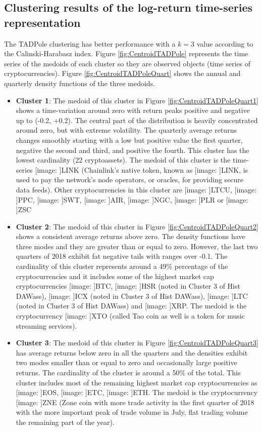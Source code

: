\documentclass{bmcart}
\def\texttt{[image: ]}
\begin{document}
\subsection*{Clustering results of the log-return time-series representation}
The  TADPole clustering \cite{TADPole2015} has better performance with a $k=3$ value according to the Calinski-Harabasz index. Figure \ref{fig:CentroidTADPole} represents the time series of the medoids of each cluster so they are observed objects (time series of cryptocurrencies). Figure \ref{fig:CentroidTADPoleQuart} shows the annual and quarterly density functions of the three medoids. 

\begin{itemize}
	\item \textbf{Cluster 1}: The medoid of this cluster in Figure \ref{fig:CentroidTADPoleQuart1} shows a time-variation around zero with return peaks positive and negative up to (-0.2, +0.2). The central part of the distribution is heavily concentrated around zero, but with extreme volatility. The quarterly average returns changes smoothly starting with a low but positive value the first quarter, negative the second and third, and positive the fourth. This cluster has the lowest cardinality (22 cryptoassets). The medoid of this cluster is the time-series \texttt{LINK} (Chainlink’s native token, known as \texttt{LINK}, is used to pay the network’s node operators, or oracles, for providing secure data feeds). Other cryptocurrencies in this cluster are \texttt{LTCU}, \texttt{PPC}, \texttt{SWT}, \texttt{AIR}, \texttt{NGC}, \texttt{PLR} or \texttt{ZSC}
	
	\item \textbf{Cluster 2}: The medoid of this cluster in Figure \ref{fig:CentroidTADPoleQuart2} shows a consistent average returns above zero. The density functions have three modes and they are greater than or equal to zero. However, the last two quarters of 2018 exhibit fat negative tails with ranges over -0.1.  The cardinality of this cluster represents around a 49\% percentage of the cryptocurrencies and it includes some of the highest market cap cryptocurrencies \texttt{BTC}, \texttt{HSR} (noted in Cluster 3 of Hist DAWass), \texttt{ICX} (noted in Cluster 3 of Hist DAWass), \texttt{LTC} (noted in Cluster 3 of Hist DAWass) and \texttt{XRP}. The medoid is the cryptocurrency \texttt{XTO} (called Tao coin as well is a  token for music streaming services). 
	
	\item \textbf{Cluster 3}: The medoid of this cluster in Figure \ref{fig:CentroidTADPoleQuart3} has average returns  below zero in all the quarters and the densities exhibit two modes smaller than or equal to zero and occasionally large positive returns. The cardinality of the cluster is around a 50\% of the total. This cluster includes most of the remaining highest market cap cryptocurrencies as \texttt{EOS}, \texttt{ETC}, \texttt{ETH}. The medoid is the cryptocurrency \texttt{ZNE} (Zone coin with more trade activity in the first quarter of 2018 with the more important peak of trade volume in July, flat trading volume the remaining part of the year). 
	
\end{itemize}
\end{document}
